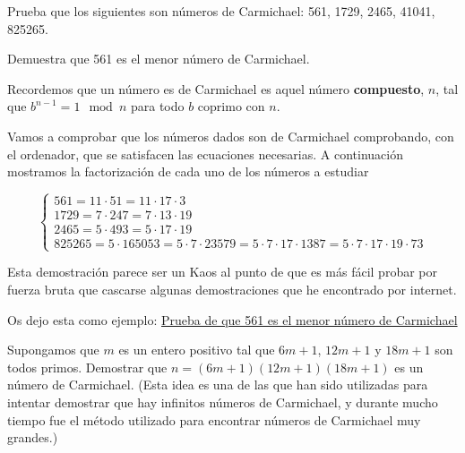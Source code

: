

\begin{problem}[11]
\ppart Prueba que los siguientes son números de Carmichael: 561,
1729, 2465, 41041, 825265.

\ppart Demuestra que 561 es el menor número de Carmichael.

\solution


\spart
Recordemos que un número es de Carmichael es aquel número \textbf{compuesto}, $n$, tal que $b^{n-1}=1 \mod n$ para todo $b$ coprimo con $n$.

Vamos a comprobar que los números dados son de Carmichael comprobando, con el ordenador, que se satisfacen las ecuaciones necesarias. A continuación mostramos la factorización de cada uno de los números a estudiar

\[ \left\{\begin{array}{l}
561 = 11 \cdot 51 = 11 \cdot 17 \cdot 3\\
1729 = 7 \cdot 247 = 7 \cdot 13 \cdot 19\\
2465 = 5 \cdot 493 = 5 \cdot 17 \cdot 19\\
825265 = 5 \cdot 165053 = 5 \cdot 7 \cdot 23579 = 5 \cdot 7 \cdot 17 \cdot 1387 = 5 \cdot 7 \cdot 17 \cdot 19 \cdot 73
\end{array}\right.\]

\spart

Esta demostración parece ser un Kaos al punto de que es más fácil probar por fuerza bruta que cascarse algunas demostraciones que he encontrado por internet.

Os dejo esta como ejemplo: \href{http://math.stackexchange.com/questions/433029/the-smallest-example-of-a-carmichael-number}{Prueba de que 561 es el menor número de Carmichael}

\end{problem}

\begin{problem}[12]
 Supongamos que $m$ es un entero positivo tal que $6m+1$, $12m+1$
y $18m+1$ son todos primos. Demostrar que $n=(6m+1)(12m+1)(18m+1)$
es un número de Carmichael. (Esta idea es una de las que han sido
utilizadas para intentar demostrar que hay infinitos números de
Carmichael, y durante mucho tiempo fue el método utilizado para
encontrar números de Carmichael muy grandes.)
\solution

\end{problem}

